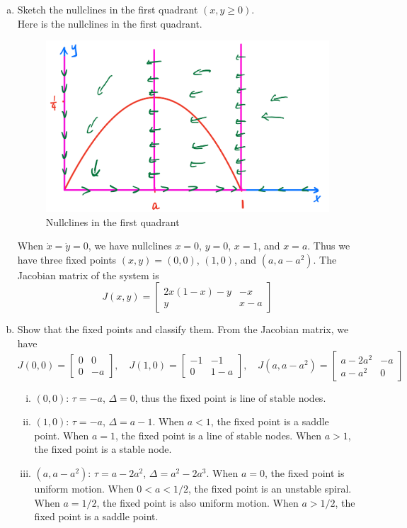 \documentclass[12pt]{exam}
\begin{document}
\begin{enumerate}[(a)]
	\item Sketch the nullclines in the first quadrant $(x, y \geq 0)$. \\
	Here is the nullclines in the first quadrant.
	\begin{figure}[ht]
		\centering
		\includegraphics[width=0.7\linewidth]{2a.jpeg}
		\caption{Nullclines in the first quadrant}
		\label{fig:2a}
	\end{figure}

	When $\dot{x} = \dot{y} = 0$, we have nullclines $x = 0$, $y = 0$, $x = 1$, and $x=a$. Thus we have three fixed points $(x,y) = (0,0)$, $(1,0)$, and $(a,a-a^2)$. The Jacobian matrix of the system is
	\[ J(x,y) = \begin{bmatrix}
		2x(1-x) - y & -x \\
		y & x-a
	\end{bmatrix} \]

	\item Show that the fixed points and classify them.
	From the Jacobian matrix, we have
	\[ J(0,0) = \begin{bmatrix}
		0 & 0 \\
		0 & -a
	\end{bmatrix}, \quad J(1,0) = \begin{bmatrix}
		-1 & -1 \\
		0 & 1-a
	\end{bmatrix}, \quad J(a,a-a^2) = \begin{bmatrix}
		a-2a^2 & -a \\
		a-a^2 & 0
	\end{bmatrix} \]
	\begin{enumerate}[(i)]
		\item $(0,0)$: $\tau = -a$, $\Delta = 0$, thus the fixed point is line of stable nodes.
		\item $(1,0)$: $\tau = -a$, $\Delta = a-1$. When $a < 1$, the fixed point is a saddle point. When $a = 1$, the fixed point is a line of stable nodes. When $a > 1$, the fixed point is a stable node.
		\item $(a,a-a^2)$: $\tau = a-2a^2$, $\Delta = a^2 - 2a^3$. When $a=0$, the fixed point is uniform motion. When $0 < a < 1/2$, the fixed point is an unstable spiral. When $a = 1/2$, the fixed point is also uniform motion. When $a > 1/2$, the fixed point is a saddle point.	
	\end{enumerate}


\end{enumerate}
\end{document}
